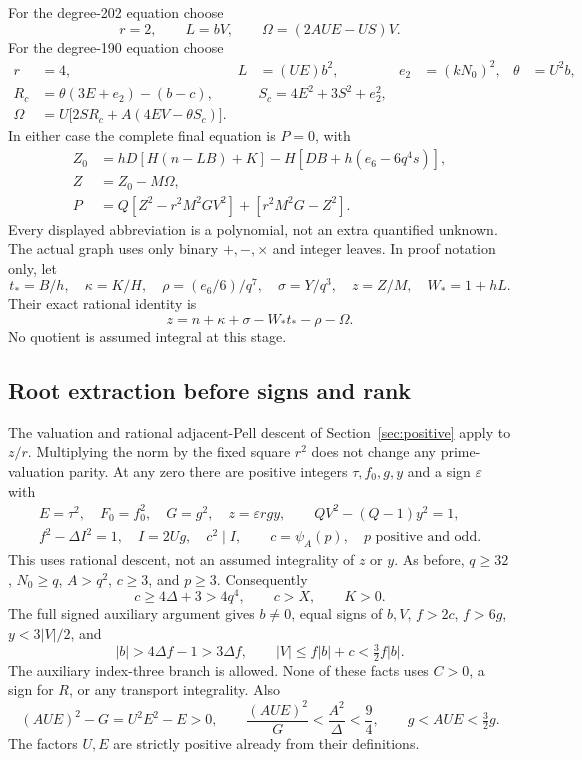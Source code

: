 For the degree-202 equation choose
\begin{equation}\label{eq:center202}
 r=2,\qquad L=bV,\qquad \Omega=(2AUE-US)V.
\end{equation}
For the degree-190 equation choose
\begin{align}
 r&=4,&L&=(UE)b^2,&e_2&=(kN_0)^2,&\theta&=U^2b,\nonumber\\
 R_c&=\theta(3E+e_2)-(b-c),&&
 S_c=4E^2+3S^2+e_2^2,\nonumber\\
 \Omega&=U\bigl[2SR_c+A(4EV-\theta S_c)\bigr].\label{eq:center190}
\end{align}
In either case the complete final equation is $P=0$, with
\begin{align}
 Z_0&=hD[H(n-LB)+K]-H[DB+h(e_6-6q^4s)],\nonumber\\
 Z&=Z_0-M\Omega,\nonumber\\
 P&=Q[Z^2-r^2M^2GV^2]+[r^2M^2G-Z^2].\label{eq:scalar23-polynomial}
\end{align}
Every displayed abbreviation is a polynomial, not an extra quantified
unknown. The actual graph uses only binary $+,-,\times$ and integer leaves.
In proof notation only, let
\[
 t_*=B/h,\quad\kappa=K/H,\quad\rho=(e_6/6)/q^7,
 \quad\sigma=Y/q^3,\quad z=Z/M,\quad W_*=1+hL.
\]
Their exact rational identity is
\begin{equation}\label{eq:scalar23-carrier}
 z=n+\kappa+\sigma-W_*t_*-\rho-\Omega.
\end{equation}
No quotient is assumed integral at this stage.

\subsection{Root extraction before signs and rank}
The valuation and rational adjacent-Pell descent of
Section~\ref{sec:positive} apply to $z/r$. Multiplying the norm by the
fixed square $r^2$ does not change any prime-valuation parity. At any zero
there are positive integers $\tau,f_0,g,y$ and a sign $\varepsilon$ with
\begin{gather*}
 E=\tau^2,\quad F_0=f_0^2,\quad G=g^2,\quad z=\varepsilon rgy,\qquad
 QV^2-(Q-1)y^2=1,\\
 f^2-\Delta I^2=1,\quad I=2Ug,\quad c^2\mid I,\qquad
 c=\psi_A(p),\quad p\text{ positive and odd}.
\end{gather*}
This uses rational descent, not an assumed integrality of $z$ or $y$.
As before, $q\ge32$, $N_0\ge q$, $A>q^2$, $c\ge3$, and $p\ge3$.
Consequently
\[
 c\ge4\Delta+3>4q^4,\qquad c>X,\qquad K>0.
\]
The full signed auxiliary argument gives $b\ne0$, equal signs of $b,V$,
$f>2c$, $f>6g$, $y<3|V|/2$, and
\begin{equation}\label{eq:scalar23-bbound}
 |b|>4\Delta f-1>3\Delta f,
 \qquad |V|\le f|b|+c<\tfrac32f|b|.
\end{equation}
The auxiliary index-three branch is allowed. None of these facts uses
$C>0$, a sign for $R$, or any transport integrality. Also
\[
 (AUE)^2-G=U^2E^2-E>0,
 \qquad \frac{(AUE)^2}{G}<\frac{A^2}{\Delta}<\frac94,
 \qquad g<AUE<\tfrac32g.
\]
The factors $U,E$ are strictly positive already from their definitions.

